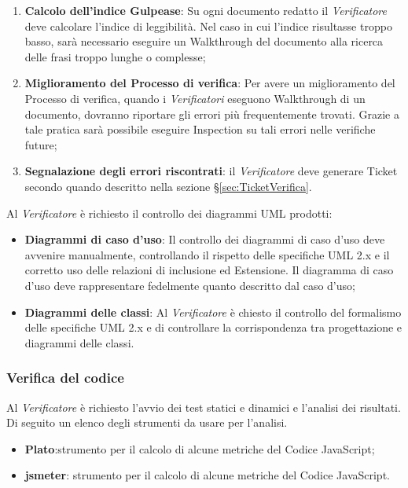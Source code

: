 {\begin{enumerate}
	\item \textbf{Calcolo dell’indice Gulpease}: Su ogni documento redatto il \emph{Verificatore} deve calcolare l’indice di leggibilità. Nel caso in cui l’indice risultasse troppo basso, sarà necessario eseguire un Walkthrough del documento alla ricerca delle frasi troppo lunghe o complesse;
	\item \textbf{Miglioramento del Processo di verifica}: Per avere un miglioramento del Processo di verifica, quando i \emph{Verificatori} eseguono Walkthrough di un documento, dovranno riportare gli errori più frequentemente trovati. Grazie a tale pratica sarà possibile eseguire Inspection su tali errori nelle verifiche future;
	\item \textbf{Segnalazione degli errori riscontrati}: il \emph{Verificatore} deve generare Ticket secondo quando descritto nella
	sezione \S\ref{sec:TicketVerifica}.
	\end{enumerate}
	\label{sec:strumentiVerifica}
Al \emph{Verificatore} è richiesto il controllo dei diagrammi UML prodotti:
\begin{itemize}

\item \textbf{Diagrammi di caso d’uso}: Il controllo dei diagrammi di caso d’uso deve avvenire manualmente, controllando il rispetto delle specifiche UML 2.x e il corretto uso delle relazioni di inclusione ed Estensione. Il diagramma di caso d’uso deve rappresentare fedelmente quanto descritto dal caso d’uso;
\item \textbf{Diagrammi delle classi}: Al \emph{Verificatore} è chiesto il controllo del formalismo delle specifiche UML 2.x e di controllare la corrispondenza tra progettazione e diagrammi delle classi.

\end{itemize}

	\subsubsection{Verifica del codice}
	Al \emph{Verificatore} è richiesto l’avvio dei test statici e dinamici e l’analisi dei risultati. Di seguito un elenco degli strumenti da usare per l’analisi.
	
	\label{sec:analisiStatica}
	  \begin{itemize}
	  \item \textbf{Plato}:strumento per il calcolo di alcune metriche del Codice JavaScript;
	  \item \textbf{jsmeter}: strumento per il calcolo di alcune metriche del Codice JavaScript.
	  \end{itemize}
	
}
